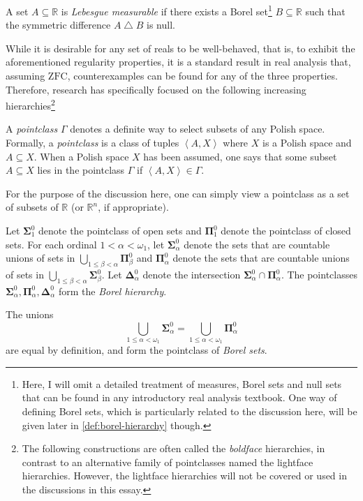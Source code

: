 \documentclass[12pt]{article}
\theoremstyle{plain}
\theoremstyle{definition}
\newcommand{\ZFC}{\mathrm{ZFC}}
\begin{document}
\begin{definition}
	A set $A \subseteq \mathbb{R}$ is \emph{Lebesgue measurable} if there exists a Borel set\footnote{Here, I will omit a detailed treatment of measures, Borel sets and null sets that can be found in any introductory real analysis textbook. One way of defining Borel sets, which is particularly related to the discussion here, will be given later in \autoref{def:borel-hierarchy} though.} $B \subseteq \mathbb{R}$ such that the symmetric difference $A \mathop{\triangle} B$ is null.
\end{definition}

While it is desirable for any set of reals to be well-behaved, that is, to exhibit the aforementioned regularity properties, it is a standard result in real analysis that, assuming $\ZFC$, counterexamples can be found for any of the three properties. Therefore, research has specifically focused on the following increasing hierarchies\footnote{The following constructions are often called the \emph{boldface} hierarchies, in contrast to an alternative family of pointclasses named the lightface hierarchies. However, the lightface hierarchies will not be covered or used in the discussions in this essay.}

\begin{definition}[Pointclasses]
	A \emph{pointclass} $\Gamma$ denotes a definite way to select subsets of any Polish space. Formally, a \emph{pointclass} is a class of tuples $\left\langle A, X \right\rangle$ where $X$ is a Polish space and $A \subseteq X$. When a Polish space $X$ has been assumed, one says that some subset $A \subseteq X$ lies in the pointclass $\Gamma$ if $\left\langle A, X \right\rangle \in \Gamma$.

	For the purpose of the discussion here, one can simply view a pointclass as a set of subsets of $\mathbb{R}$ (or $\mathbb{R}^n$, if appropriate).
\end{definition}

\begin{definition}
	\label{def:borel-hierarchy}
	Let $\boldsymbol\Sigma^0_1$ denote the pointclass of open sets and $\boldsymbol\Pi^0_1$ denote the pointclass of closed sets. For each ordinal $1 < \alpha < \omega_1$, let $\boldsymbol\Sigma^0_\alpha$ denote the sets that are countable unions of sets in $\bigcup_{1 \leq \beta < \alpha} \boldsymbol\Pi^0_\beta$ and $\boldsymbol\Pi^0_\alpha$ denote the sets that are countable unions of sets in $\bigcup_{1 \leq \beta < \alpha} \boldsymbol\Sigma^0_\beta$. Let $\boldsymbol\Delta^0_\alpha$ denote the intersection $\boldsymbol\Sigma^0_\alpha \cap \boldsymbol\Pi^0_\alpha$. The pointclasses $\boldsymbol\Sigma^0_\alpha, \boldsymbol\Pi^0_\alpha, \boldsymbol\Delta^0_\alpha$ form the \emph{Borel hierarchy}.

	The unions
	\[\bigcup_{1 \leq \alpha < \omega_1} \boldsymbol\Sigma^0_\alpha = \bigcup_{1 \leq \alpha < \omega_1} \boldsymbol\Pi^0_\alpha\]
	are equal by definition, and form the pointclass of \emph{Borel sets}.
\end{definition}
\end{document}
